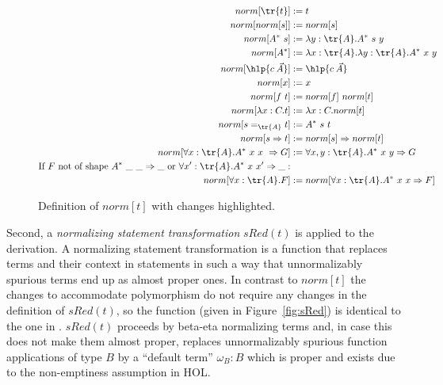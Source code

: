 \begin{figure}[t]
  \centering
  \begin{align*}
    norm[\tr{t}] &:= t \\
    norm[norm[s]] &:= norm[s] \\
    norm[A^*\ s] &:= \lambda y:\tr{A}.A^*\ s\ y \\
    norm[A^*] &:= \lambda x:\tr{A}.\lambda y:\tr{A}.A^*\ x\ y \\
    norm[\hlp{c\: \vec{A}}] &:= \hlp{c\: \vec{A}} \\
    norm[x] &:= x \\
    norm[f\ t] &:= norm[f]\ norm[t] \\
    norm[\lambda x:C.t] &:= \lambda x:C.norm[t] \\
    norm[s=_{\tr{A}} t] &:= A^*\ s\ t \\
    norm[s \Rightarrow t] &:= norm[s] \Rightarrow norm[t] \\
    norm[\forall x:\tr{A}.A^*\ x\ x\ \Rightarrow G] &:= \forall x,y:\tr{A}.A^*\ x\ y
                                                      \Rightarrow G \\
    \text{If } F \text{ not of shape } A^*\ \_\ \_ \Rightarrow \_ \text{ or } \forall x':\tr{A}.A^*\ x\ x'
    \Rightarrow \_:\\
    norm[\forall x:\tr{A}.F] &:= norm[\forall x:\tr{A}.A^*\ x\ x \Rightarrow F] \\
  \end{align*}
  \caption{\label{fig:norm} Definition of \(norm[t]\) with changes highlighted.}
\end{figure}

Second,  a \emph{normalizing statement transformation} \(sRed(t)\)
is applied to the derivation.
A normalizing statement transformation is a function that replaces terms and their
context in statements in such a way that unnormalizably spurious terms end up as almost proper
ones. In contrast to \(norm[t]\) the changes to accommodate polymorphism do not require
any changes in the definition of \(sRed(t)\), so the function (given in Figure~\ref{fig:sRed})
is identical to the one in \cite{RRB23ext}. \(sRed(t)\) proceeds by beta-eta normalizing terms and, in
case this does not make them almost proper, replaces unnormalizably spurious function
applications of type \(B\) by a ``default term'' \(\omega_B : B\) which is proper and exists
due to the non-emptiness assumption in HOL.

